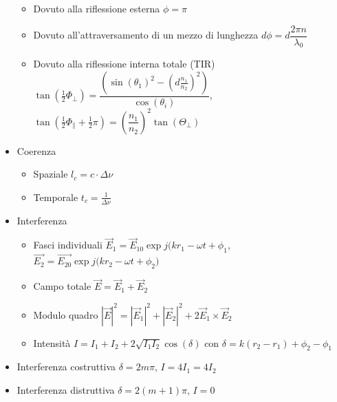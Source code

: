 \documentclass{article}
\begin{document}
\begin{itemize}
\begin{itemize}
          \item Dovuto alla riflessione esterna \( \phi = \pi \)
          \item Dovuto all'attraversamento di un mezzo di lunghezza \( d \phi = d \dfrac{2 \pi n}{\lambda_0} \)
          \item Dovuto alla riflessione interna totale (TIR) \( \tan\left(\frac{1}{2} \Phi_\perp\right) = \dfrac{\left(\sin(\theta_1)^2 - ( d\frac{n_1}{n_2})^2 \right)}{\cos(\theta_i)} \), \( \tan(\frac{1}{2} \Phi_\parallel + \frac{1}{2} \pi) = (\dfrac{n_1}{n_2})^2 \tan(\Theta_\perp) \)
        \end{itemize}
  \item Coerenza
        \begin{itemize}
          \item Spaziale \( l_c = c \cdot \Delta \nu \)
          \item Temporale \( t_c = \frac{1}{\Delta \nu} \)
        \end{itemize}
  \item Interferenza
        \begin{itemize}
          \item Fasci individuali \( \vec{E}_1 = \vec{E}_{10} \exp{j (k r_1 - \omega t + \phi_1} \), \( \vec{E_2} = \vec{E_{20}} \exp{j (k r_2 - \omega t + \phi_2}) \)
          \item Campo totale \( \vec{E} = \vec{E}_1 + \vec{E}_2 \)
          \item Modulo quadro \(  |\vec{E}| ^ 2 = |\vec{E}_1| ^ 2 + |\vec{E}_2| ^ 2 + 2 \vec{E}_1 \times \vec{E}_2 \)
          \item Intensità \(  I = I_1 + I_2 + 2 \sqrt{I_1 I_2} \cos(\delta) \) con \( \delta = k(r_2 - r_1) + \phi_2 - \phi_1 \)
        \end{itemize}
  \item Interferenza costruttiva \( \delta = 2m\pi\), \(I = 4 I_1 = 4 I_2 \)
  \item Interferenza distruttiva \( \delta = 2(m + 1)\pi\), \(I = 0 \)
\end{itemize}
\end{document}
